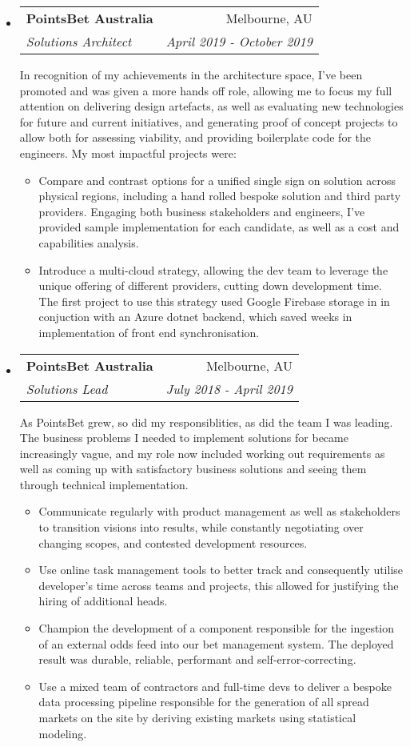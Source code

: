 \documentclass[letterpaper,11pt]{article}
\makeatletter
\newcommand{\resitem}[1]{\item #1 \vspace{-2pt}}
\newcommand{\ressubheading}[4]{
\begin{tabular*}{6.5in}{l@{\cftdotfill{\cftsecdotsep}\extracolsep{\fill}}r}
		\textbf{#1} & #2 \\
		\textit{#3} & \textit{#4} \\
\end{tabular*}}
\makeatother
\begin{document}
\begin{itemize}
\item[]
    \ressubheading{PointsBet Australia}{Melbourne, AU}{Solutions Architect}{April 2019 - October 2019}
    
    In recognition of my achievements in the architecture space, I've been promoted and was given a more hands off role, allowing me to focus my full attention on delivering design artefacts, as well as evaluating new technologies for future and current initiatives, and generating proof of concept projects to allow both for assessing viability, and providing boilerplate code for the engineers.
    My most impactful projects were:
    
    \begin{itemize}
        \resitem{Compare and contrast options for a unified single sign on solution across physical regions, including a hand rolled bespoke solution and third party providers. Engaging both business stakeholders and engineers, I've provided sample implementation for each candidate, as well as a cost and capabilities analysis.}
        \resitem{Introduce a multi-cloud strategy, allowing the dev team to leverage the unique offering of different providers, cutting down development time. The first project to use this strategy used Google Firebase storage in in conjuction with an Azure dotnet backend, which saved weeks in implementation of front end synchronisation.}
    \end{itemize}
    
\item[]
	\ressubheading{PointsBet Australia}{Melbourne, AU}{Solutions Lead}{July 2018 - April 2019}
	
	As PointsBet grew, so did my responsiblities, as did the team I was leading. The business problems I needed to implement solutions for became increasingly vague, and my role now included working out requirements as well as coming up with satisfactory business solutions and seeing them through technical implementation.
	
    \begin{itemize}
    	\resitem{Communicate regularly with product management as well as stakeholders to transition visions into results, while constantly negotiating over changing scopes, and contested development resources.}
    	\resitem{Use online task management tools to better track and consequently utilise developer's time across teams and projects, this allowed for justifying the hiring of additional heads.}
    	\resitem{Champion the development of a component responsible for the ingestion of an external odds feed into our bet management system. The deployed result was durable, reliable, performant and self-error-correcting.}
    	\resitem{Use a mixed team of contractors and full-time devs to deliver a bespoke data processing pipeline responsible for the generation of all spread markets on the site by deriving existing markets using statistical modeling.}
    \end{itemize}
	

\end{itemize}
\end{document}
